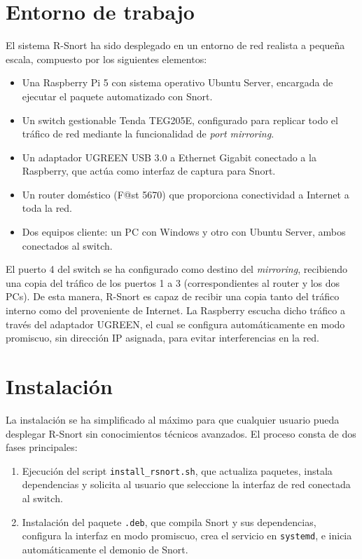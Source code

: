 \documentclass[12pt,a4paper]{report}
\begin{document}
\section{Entorno de trabajo}

El sistema R-Snort ha sido desplegado en un entorno de red realista a pequeña escala, compuesto por los siguientes elementos:

\begin{itemize}
	\item Una Raspberry Pi 5 con sistema operativo Ubuntu Server, encargada de ejecutar el paquete automatizado con Snort.
	\item Un switch gestionable Tenda TEG205E, configurado para replicar todo el tráfico de red mediante la funcionalidad de \textit{port mirroring}.
	\item Un adaptador UGREEN USB 3.0 a Ethernet Gigabit conectado a la Raspberry, que actúa como interfaz de captura para Snort.
	\item Un router doméstico (F@st 5670) que proporciona conectividad a Internet a toda la red.
	\item Dos equipos cliente: un PC con Windows y otro con Ubuntu Server, ambos conectados al switch.
\end{itemize}

El puerto 4 del switch se ha configurado como destino del \textit{mirroring}, recibiendo una copia del tráfico de los puertos 1 a 3 (correspondientes al router y los dos PCs). De esta manera, R-Snort es capaz de recibir una copia tanto del tráfico interno como del proveniente de Internet. La Raspberry escucha dicho tráfico a través del adaptador UGREEN, el cual se configura automáticamente en modo promiscuo, sin dirección IP asignada, para evitar interferencias en la red.

\section{Instalación}

La instalación se ha simplificado al máximo para que cualquier usuario pueda desplegar R-Snort sin conocimientos técnicos avanzados. El proceso consta de dos fases principales:

\begin{enumerate}
	\item Ejecución del script \texttt{install\_rsnort.sh}, que actualiza paquetes, instala dependencias y solicita al usuario que seleccione la interfaz de red conectada al switch.
	\item Instalación del paquete \texttt{.deb}, que compila Snort y sus dependencias, configura la interfaz en modo promiscuo, crea el servicio en \texttt{systemd}, e inicia automáticamente el demonio de Snort.
\end{enumerate}
\end{document}
